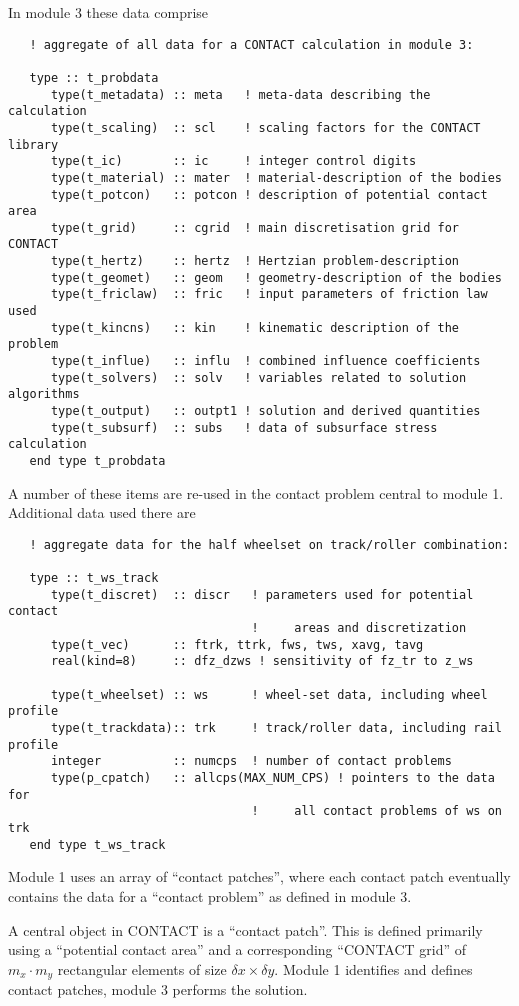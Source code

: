 \documentclass[12pt]{report}
\begin{document}
In module 3 these data comprise
{\small\begin{verbatim}
   ! aggregate of all data for a CONTACT calculation in module 3:

   type :: t_probdata
      type(t_metadata) :: meta   ! meta-data describing the calculation
      type(t_scaling)  :: scl    ! scaling factors for the CONTACT library
      type(t_ic)       :: ic     ! integer control digits
      type(t_material) :: mater  ! material-description of the bodies
      type(t_potcon)   :: potcon ! description of potential contact area
      type(t_grid)     :: cgrid  ! main discretisation grid for CONTACT
      type(t_hertz)    :: hertz  ! Hertzian problem-description
      type(t_geomet)   :: geom   ! geometry-description of the bodies
      type(t_friclaw)  :: fric   ! input parameters of friction law used
      type(t_kincns)   :: kin    ! kinematic description of the problem
      type(t_influe)   :: influ  ! combined influence coefficients
      type(t_solvers)  :: solv   ! variables related to solution algorithms
      type(t_output)   :: outpt1 ! solution and derived quantities
      type(t_subsurf)  :: subs   ! data of subsurface stress calculation
   end type t_probdata
\end{verbatim}}
A number of these items are re-used in the contact problem central to module
1. Additional data used there are
{\small\begin{verbatim}
   ! aggregate data for the half wheelset on track/roller combination:

   type :: t_ws_track
      type(t_discret)  :: discr   ! parameters used for potential contact
                                  !     areas and discretization
      type(t_vec)      :: ftrk, ttrk, fws, tws, xavg, tavg
      real(kind=8)     :: dfz_dzws ! sensitivity of fz_tr to z_ws

      type(t_wheelset) :: ws      ! wheel-set data, including wheel profile
      type(t_trackdata):: trk     ! track/roller data, including rail profile
      integer          :: numcps  ! number of contact problems
      type(p_cpatch)   :: allcps(MAX_NUM_CPS) ! pointers to the data for
                                  !     all contact problems of ws on trk
   end type t_ws_track
\end{verbatim}}
Module 1 uses an array of ``contact patches'', where each contact patch
eventually contains the data for a ``contact problem'' as defined in module
3.

A central object in CONTACT is a ``contact patch''. This is defined
primarily using a ``potential contact area'' and a corresponding ``CONTACT
grid'' of $m_x\cdot m_y$ rectangular elements of size $\delta
x\times\delta y$. Module 1 identifies and defines contact patches, module 3
performs the solution.
\end{document}
